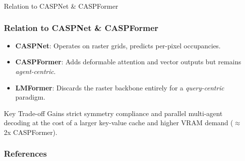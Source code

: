 \documentclass[10pt,aspectratio=169]{beamer}
\begin{document}
\begin{frame}{Relation to CASPNet \& CASPFormer}
    \frametitle{Relation to CASPNet \& CASPFormer}
    \begin{itemize}
        \item \textbf{CASPNet}: Operates on raster grids, predicts per-pixel occupancies.
        \item \textbf{CASPFormer}: Adds deformable attention and vector outputs but remains \emph{agent-centric}.
        \item \textbf{LMFormer}: Discards the raster backbone entirely for a \emph{query-centric} paradigm.
    \end{itemize}
    \vfill
    \begin{alertblock}{Key Trade-off}
    Gains strict symmetry compliance and parallel multi-agent decoding at the cost of a larger key-value cache and higher VRAM demand (\(\approx\)2x CASPFormer).
    \end{alertblock}
\end{frame}

\begin{frame}[allowframebreaks]
  \frametitle{References}
  
  
\end{frame}
\end{document}
